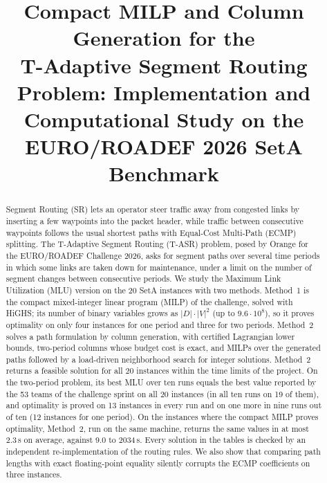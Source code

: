 \documentclass[conference]{IEEEtran}
\begin{document}
\raggedbottom

\title{Compact MILP and Column Generation for the\\ T-Adaptive Segment Routing Problem: Implementation and Computational Study on the EURO/ROADEF 2026 SetA Benchmark}

\author{
}

\maketitle

\begin{abstract}
Segment Routing (SR) lets an operator steer traffic away from congested links by inserting a few waypoints into the packet header, while traffic between consecutive waypoints follows the usual shortest paths with Equal-Cost Multi-Path (ECMP) splitting. The T-Adaptive Segment Routing (T-ASR) problem, posed by Orange for the EURO/ROADEF Challenge 2026, asks for segment paths over several time periods in which some links are taken down for maintenance, under a limit on the number of segment changes between consecutive periods. We study the Maximum Link Utilization (MLU) version on the 20 SetA instances with two methods. Method~1 is the compact mixed-integer linear program (MILP) of the challenge, solved with HiGHS; its number of binary variables grows as $|D|\cdot|V|^2$ (up to $9.6\cdot10^8$), so it proves optimality on only four instances for one period and three for two periods. Method~2 solves a path formulation by column generation, with certified Lagrangian lower bounds, two-period columns whose budget cost is exact, and MILPs over the generated paths followed by a load-driven neighborhood search for integer solutions. Method~2 returns a feasible solution for all 20 instances within the time limits of the project. On the two-period problem, its best MLU over ten runs equals the best value reported by the 53 teams of the challenge sprint on all 20 instances (in all ten runs on 19 of them), and optimality is proved on 13 instances in every run and on one more in nine runs out of ten (12 instances for one period). On the instances where the compact MILP proves optimality, Method~2, run on the same machine, returns the same values in at most 2.3\,s on average, against 9.0 to 2034\,s. Every solution in the tables is checked by an independent re-implementation of the routing rules. We also show that comparing path lengths with exact floating-point equality silently corrupts the ECMP coefficients on three instances.
\end{abstract}
\end{document}
